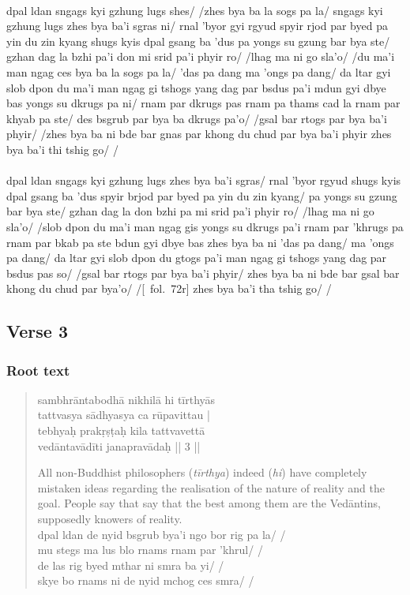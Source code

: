 \documentclass[12pt]{article}
\begin{document}
\textbf{\TVA}\\
dpal ldan sngags kyi gzhung lugs shes/ /zhes bya ba la sogs pa la/ sngags kyi gzhung lugs zhes bya ba'i sgras ni/ rnal 'byor gyi rgyud spyir rjod par byed pa yin du zin kyang shugs kyis dpal gsang ba 'dus pa yongs su gzung bar bya ste/ gzhan dag la bzhi pa'i don mi srid pa'i phyir ro/ /lhag ma ni go sla'o/ /du ma'i man ngag ces bya ba la sogs pa la/ 'das pa dang ma 'ongs pa dang/ da ltar gyi slob dpon du ma'i man ngag gi tshogs yang dag par bsdus pa'i mdun gyi dbye bas yongs su dkrugs pa ni/ rnam par dkrugs pas rnam pa thams cad la rnam par khyab pa ste/ des bsgrub par bya ba dkrugs pa'o/ /gsal bar rtogs par bya ba'i phyir/ /zhes bya ba ni bde bar gnas par khong du chud par bya ba'i phyir zhes bya ba'i thi tshig go/ /\\

\textbf{\TVB}\\
dpal ldan sngags kyi gzhung lugs zhes bya ba'i sgras/ rnal 'byor rgyud shugs kyis dpal gsang ba 'dus spyir brjod par byed pa yin du zin kyang/ pa yongs su gzung bar bya ste/ gzhan dag la don bzhi pa mi srid pa'i phyir ro/ /lhag ma ni go sla'o/ /slob dpon du ma'i man ngag gis yongs su dkrugs pa'i rnam par 'khrugs pa rnam par bkab pa ste bdun gyi dbye bas zhes bya ba ni 'das pa dang/ ma 'ongs pa dang/ da ltar gyi slob dpon du gtogs pa'i man ngag gi tshogs yang dag par bsdus pas so/ /gsal bar rtogs par bya ba'i phyir/ zhes bya ba ni bde bar gsal bar khong du chud par bya'o/ /[\TVB\ fol.\ 72r] zhes bya ba'i tha tshig go/ /

\subsection{Verse 3}
\subsubsection{Root text}
\begin{quote}
	sambhrāntabodhā nikhilā hi tīrthyās \\%
	tattvasya sādhyasya ca rūpavittau |\\
	tebhyaḥ prakṛṣṭaḥ kila tattvavettā\\
	vedāntavādīti janapravādaḥ || 3 ||

	All non-Buddhist philosophers (\emph{tīrthya}) indeed (\emph{hi}) have completely mistaken ideas regarding the realisation of the nature of reality and the goal.
	People say that say that the best among them are the Vedāntins, supposedly knowers of reality.\\

	dpal ldan de nyid bsgrub bya'i ngo bor rig pa la/ /\\
	mu stegs ma lus blo rnams rnam par 'khrul/ /\\
	de las rig byed mthar ni smra ba yi/ /\\
	skye bo rnams ni de nyid mchog ces smra/ /
\end{quote}
\end{document}
